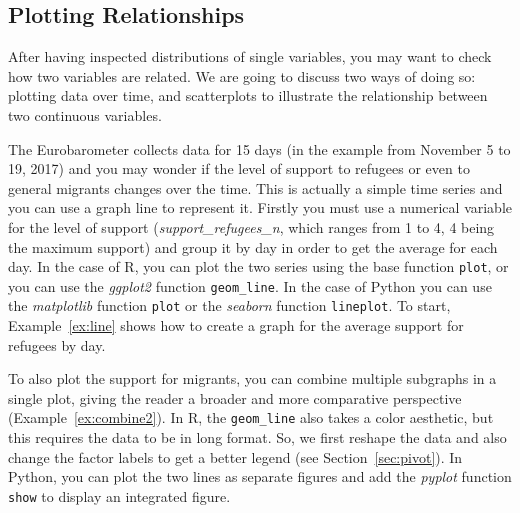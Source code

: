 \subsection{Plotting Relationships}

After having inspected distributions of single variables, you may want to check how two variables are related. We are going to discuss two ways of doing so: plotting data over time, and scatterplots to illustrate the relationship between two continuous variables.

The Eurobarometer collects data for 15 days (in the example from November 5 to 19, 2017) and you may wonder if the level of support to refugees or even to general migrants changes over the time. This is actually a simple time series and you can use a graph line to represent it. Firstly you must use a numerical variable for the level of support (\emph{support\_refugees\_n}, which ranges from 1 to 4, 4 being the maximum support) and group it by day in order to get the average for each day. In the case of R, you can plot the two series using the base function \texttt{plot}, or you can use the \emph{ggplot2} function \texttt{geom\_line}. In the case of Python you can use the \emph{matplotlib} function \texttt{plot} or the \emph{seaborn} function \texttt{lineplot}. To start, Example~\ref{ex:line} shows how to create a graph for the average support for refugees by day.



To also plot the support for migrants, you can combine multiple subgraphs in a single plot,
giving the reader a broader and more comparative perspective (Example~\ref{ex:combine2}).
In R, the \texttt{geom\_line} also takes a color aesthetic, but this requires the data to be in long format.
So, we first reshape the data and also change the factor labels to get a better legend (see Section~\ref{sec:pivot}).
In Python, you can plot the two lines as separate figures  and add the \emph{pyplot} function \texttt{show} to display an integrated figure.



